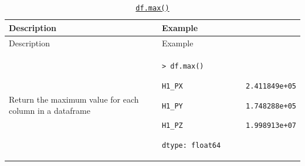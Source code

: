\documentclass[10pt,a4paperpaper,]{article}
\begin{document}
\begin{longtable}[]{@{}ll@{}}
\caption{\href{http://pandas.pydata.org/pandas-docs/stable/generated/pandas.DataFrame.max.html}{\texttt{df.max()}}}\tabularnewline
\toprule
\begin{minipage}[b]{0.47\columnwidth}\raggedright\strut
Description\strut
\end{minipage} & \begin{minipage}[b]{0.47\columnwidth}\raggedright\strut
Example\strut
\end{minipage}\tabularnewline
\midrule
\endfirsthead
\toprule
\begin{minipage}[b]{0.47\columnwidth}\raggedright\strut
Description\strut
\end{minipage} & \begin{minipage}[b]{0.47\columnwidth}\raggedright\strut
Example\strut
\end{minipage}\tabularnewline
\midrule
\endhead
\begin{minipage}[t]{0.47\columnwidth}\raggedright\strut
Return the maximum value for each column in a dataframe\strut
\end{minipage} & \begin{minipage}[t]{0.47\columnwidth}\raggedright\strut
\texttt{\textgreater{}\ df.max()}

\texttt{H1\_PX\ \ \ \ \ \ \ \ \ \ \ \ \ \ \ 2.411849e+05}

\texttt{H1\_PY\ \ \ \ \ \ \ \ \ \ \ \ \ \ \ 1.748288e+05}

\texttt{H1\_PZ\ \ \ \ \ \ \ \ \ \ \ \ \ \ \ 1.998913e+07}

\texttt{dtype:\ float64}\strut
\end{minipage}\tabularnewline
\bottomrule
\end{longtable}
\end{document}
